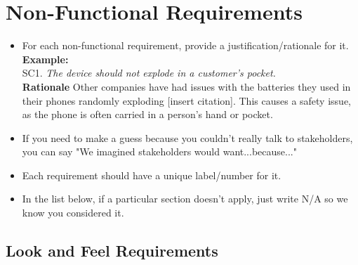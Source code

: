 \documentclass[]{article}
\begin{document}
\newpage
\section{Non-Functional Requirements}
\label{sec:non-functional_requirements}


\begin{itemize}
	\item For each non-functional requirement, provide a justification/rationale for it.\\
	      {\bf Example:} \\
	      SC1. \emph{The device should not explode in a customer’s pocket.}\\
	      {\bf Rationale} Other companies have had issues with the batteries they used in their phones randomly exploding [insert citation]. This causes a safety issue, as the phone is often carried in a person's hand or pocket.
	\item If you need to make a guess because you couldn't really talk to stakeholders, you can say "We imagined stakeholders would want...because..."
	\item Each requirement should have a unique label/number for it.
	\item In the list below, if a particular section doesn't apply, just write N/A so we know you considered it.
\end{itemize}

\subsection{Look and Feel Requirements}
\label{sub:look_and_feel_requirements}
\end{document}
